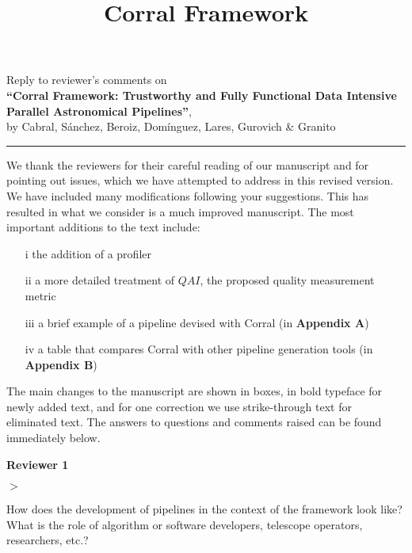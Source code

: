 \documentclass[a4paper,onecolumn,fleqn,usenatbib,useAMS]{mnrasr}
\newenvironment{myindentpar}[1]%
 {\begin{list}{}%
         \bigskip
         \color{refereecolor}
         {\setlength{\leftmargin}{#1}}%
         \itshape
         \item[$>$]%
 }
 {\end{list}}
\begin{document}
\title{Corral Framework}

\large

\begin{center}
\large
Reply to reviewer's comments on \\
\textbf{``Corral Framework: Trustworthy and Fully Functional Data Intensive
Parallel Astronomical Pipelines''}, \\
by Cabral, S\'anchez, Beroiz, Dom\'inguez, Lares, Gurovich \& Granito
   
\noindent \rule{\textwidth}{0.1pt}

\normalsize
\end{center}

\noindent
\begin{minipage}{\textwidth}

\linespread{1.2}\selectfont
\vspace{0.15cm}

We thank the reviewers for their careful reading of our
manuscript and for pointing out issues,
which we have attempted to address in this revised version. 
%
We have included many modifications following your suggestions. 
This has resulted in what we consider is a much improved manuscript.
% 
The most important additions to the text include:
\begin{itemize}
\item[i]the addition of a profiler
\item[ii] a more detailed treatment of $QAI$, the proposed quality measurement metric 
\item[iii] a brief example of a pipeline devised with Corral (in \textbf{Appendix A})
\item[iv] a table that compares Corral with other pipeline generation tools (in \textbf{Appendix B})
\end{itemize}

%
The main changes to the manuscript are shown in boxes, in bold
typeface for newly added text, and for one correction 
we use strike-through text for eliminated text.
%
The answers to questions and comments raised can be found immediately below.


\end{minipage}  

\vspace{0.7cm}
\bfseries
Reviewer 1 \\
\mdseries
 
\begin{myindentpar}{1cm} 
How does the development of pipelines in the context of the
framework look like? What is the role of algorithm or software
developers, telescope operators, researchers, etc.?

\end{myindentpar}
\end{document}

